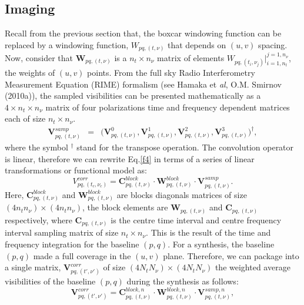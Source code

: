 \documentclass[useAMS,usenatbib]{mn2e}
\begin{document}
\subsection{Imaging}
\label{sec:imaging}
Recall from the previous section that, the boxcar windowing function can be replaced by a windowing function, $W_{pq,(t,\nu)}$ that depends 
on $(u,v)$ spacing. Now, consider that $\mathcal{\textbf{W}}_{pq,(t,\nu)}$ is a $n_t \times n_{\nu}$ matrix of elements 
$W_{pq,(t_i,\nu_j)}|_{i=1,n_t}^{j=1, n_{\nu}}$, the weights of $(u,v)$ points. From the full sky Radio Interferometry Measurement Equation 
(RIME) formalism (see Hamaka et \textit{al}, O.M. Smirnov (2010a)), the sampled visibilities can be presented mathematically as a $4\times 
n_t\times n_{\nu}$ matrix of four polarizations time and 
frequency dependent matrices each of size $n_t\times n_{\nu}$.
\begin{eqnarray*}
\mathbf{V}_{pq,(t,\nu)}^{samp}&=&\Bigg(\mathbf{V}_{pq,(t,\nu)}^{0},\mathbf { V } 
^1_{pq,(t,\nu)},\mathbf{V}^2_{pq,(t,\nu)},\mathbf{V}_{pq,(t,\nu)}^{3 } \Bigg)^{\dagger}, \label{eqx:conv}
\end{eqnarray*}
where the symbol $^{\dagger}$ stand for the transpose operation. The convolution operator is linear, therefore we can rewrite Eq.\ref{f4} 
in terms of a series of linear transformations or functional model as:
\begin{equation}
V_{pq,(t_c,\nu_c)}^{corr}= \mathbf{C}_{pq,(t,\nu)}^{block}\cdot\mathbf{W}_{pq,(t,\nu)}^{block}\cdot 
\mathbf{V}_{pq,(t,\nu)}^{samp}.\label{eqbb:linear}
\end{equation}
Here, $\mathbf{C}_{pq,(t,\nu)}^{block}$ and $\mathbf{W}_{pq,(t,\nu)}^{block}$ are  blocks diagonals matrices of size $(4n_t 
n_{\nu})\times(4n_t n_{\nu})$, the block elements are $\mathcal{\textbf{W}}_{pq,(t,\nu)}$ and $\mathbf{C}_{pq,(t,\nu)}$ 
respectively, where $\mathbf{C}_{pq,(t,\nu)}$ is the centre time interval and centre frequency interval sampling matrix of size $n_t\times 
n_{\nu}$. This
is the result of the time and frequency integration for the baseline $(p,q)$.
For a synthesis, the baseline $(p,q)$ made a full coverage in the $(u,v)$ plane. Therefore, we can  
package into a single matrix, $\mathbf{V}_{pq,(t',\nu')}^{corr}$ of size $(4N_t N_{\nu})\times (4N_t N_{\nu})$ the 
weighted average visibilities of the  baseline $(p,q)$ during the synthesis as follows: 
\begin{equation}
\mathbf{V}_{pq,(t',\nu')}^{corr}=\mathbf{C}_{pq,(t,\nu)}^{block,n}\cdot 
\mathbf{W}_{pq,(t,\nu)}^{block,n}\cdot\mathbf{V}_{pq,(t,\nu)}^{samp,n},\label{ eq2:block}
\end{equation}
\end{document}
